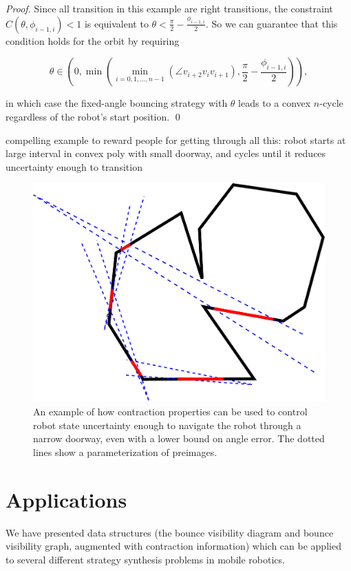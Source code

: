 \documentclass[]{styles/svproc}  %
\begin{document}
\begin{proof}
Since all transition in this example are right transitions, the constraint $C(\theta,\phi_{i-1, i})<1$ is equivalent to $\theta < \frac{\pi}{2}-\frac{\phi_{i-1, i}}{2}$. So we can guarantee that this condition holds for the orbit by requiring

\begin{equation*}
\theta \in (0, \min(\min_{i = 0, 1, \dots, n-1}(\angle v_{i+2}v_{i}v_{i+1}),
\frac{\pi}{2}-\frac{\phi_{i-1, i}}{2})),
\end{equation*}

in which case the fixed-angle bouncing strategy with $\theta$ leads to a convex
$n$-cycle regardless of the robot's start position.
\qed

\end{proof}


{\color{red} compelling example to reward people for getting through all this:
robot starts at large interval in convex poly with small doorway, and cycles
until it reduces uncertainty enough to transition}

\begin{figure}
    \includegraphics[width=0.6\linewidth]{figures/bounce_preimages.pdf}
    \centering
    \caption{An example of how contraction properties can be used to control
robot state uncertainty enough to navigate the robot through a narrow doorway,
even with a lower bound on angle error. The dotted lines show a 
parameterization of preimages.}
\label{fig:preimage_example}
\end{figure}


\section{Applications}

We have presented data structures (the bounce visibility diagram and bounce
visibility graph, augmented with contraction information) which can be applied
to several different strategy synthesis problems in mobile robotics.
\end{document}
